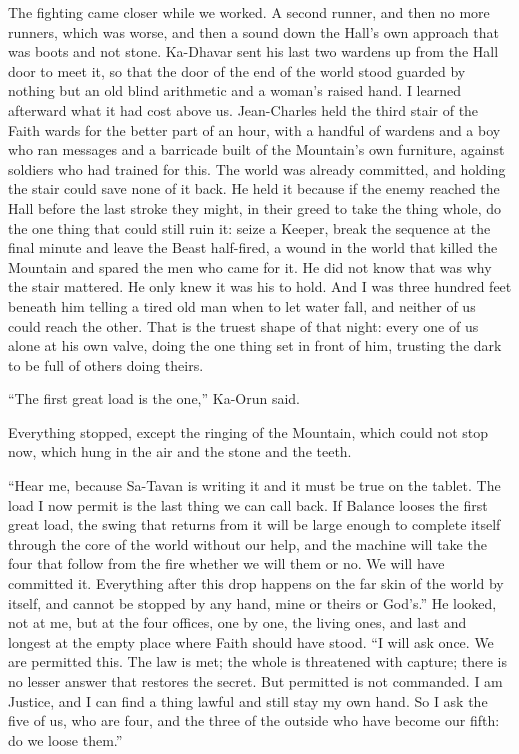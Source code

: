 The fighting came closer while we worked. A second runner, and then no more runners, which was worse, and then a sound down the Hall's own approach that was boots and not stone. Ka-Dhavar sent his last two wardens up from the Hall door to meet it, so that the door of the end of the world stood guarded by nothing but an old blind arithmetic and a woman's raised hand. I learned afterward what it had cost above us. Jean-Charles held the third stair of the Faith wards for the better part of an hour, with a handful of wardens and a boy who ran messages and a barricade built of the Mountain's own furniture, against soldiers who had trained for this. The world was already committed, and holding the stair could save none of it back. He held it because if the enemy reached the Hall before the last stroke they might, in their greed to take the thing whole, do the one thing that could still ruin it: seize a Keeper, break the sequence at the final minute and leave the Beast half-fired, a wound in the world that killed the Mountain and spared the men who came for it. He did not know that was why the stair mattered. He only knew it was his to hold. And I was three hundred feet beneath him telling a tired old man when to let water fall, and neither of us could reach the other. That is the truest shape of that night: every one of us alone at his own valve, doing the one thing set in front of him, trusting the dark to be full of others doing theirs.\par

\ornament

``The first great load is the one,'' Ka-Orun said.\par

Everything stopped, except the ringing of the Mountain, which could not stop now, which hung in the air and the stone and the teeth.\par

``Hear me, because Sa-Tavan is writing it and it must be true on the tablet. The load I now permit is the last thing we can call back. If Balance looses the first great load, the swing that returns from it will be large enough to complete itself through the core of the world without our help, and the machine will take the four that follow from the fire whether we will them or no. We will have committed it. Everything after this drop happens on the far skin of the world by itself, and cannot be stopped by any hand, mine or theirs or God's.'' He looked, not at me, but at the four offices, one by one, the living ones, and last and longest at the empty place where Faith should have stood. ``I will ask once. We are permitted this. The law is met; the whole is threatened with capture; there is no lesser answer that restores the secret. But permitted is not commanded. I am Justice, and I can find a thing lawful and still stay my own hand. So I ask the five of us, who are four, and the three of the outside who have become our fifth: do we loose them.''\par

